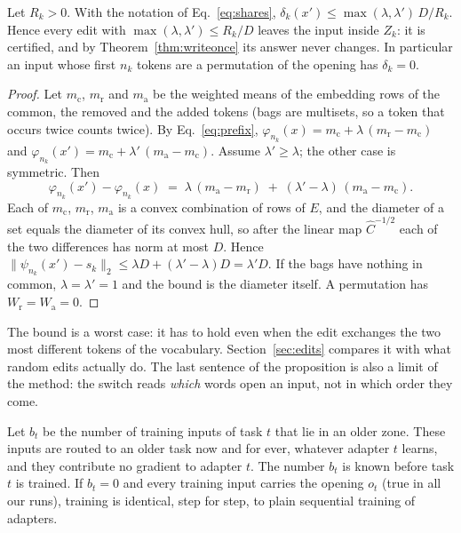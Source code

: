 \begin{proposition}
\label{prop:edits}
Let $R_k > 0$. With the notation of Eq.~\eqref{eq:shares}, $\delta_k(x') \le \max(\lambda, \lambda')\, D / R_k$.
Hence every edit with $\max(\lambda, \lambda') \le R_k / D$ leaves the input inside $Z_k$: it is
certified, and by Theorem~\ref{thm:writeonce} its answer never changes. In particular an input
whose first $n_k$ tokens are a permutation of the opening has $\delta_k = 0$.
\end{proposition}

\begin{proof}
Let $m_{\mathrm{c}}$, $m_{\mathrm{r}}$ and $m_{\mathrm{a}}$ be the weighted means of the embedding rows of the common, the removed
and the added tokens (bags are multisets, so a token that occurs twice counts twice). By
Eq.~\eqref{eq:prefix}, $\varphi_{n_k}(x) = m_{\mathrm{c}} + \lambda\,(m_{\mathrm{r}} - m_{\mathrm{c}})$ and
$\varphi_{n_k}(x') = m_{\mathrm{c}} + \lambda'\,(m_{\mathrm{a}} - m_{\mathrm{c}})$. Assume $\lambda' \ge \lambda$; the other case is
symmetric. Then
\[
  \varphi_{n_k}(x') - \varphi_{n_k}(x) \;=\; \lambda\,(m_{\mathrm{a}} - m_{\mathrm{r}}) \;+\; (\lambda' - \lambda)\,(m_{\mathrm{a}} - m_{\mathrm{c}}) .
\]
Each of $m_{\mathrm{c}}$, $m_{\mathrm{r}}$, $m_{\mathrm{a}}$ is a convex combination of rows of $E$, and the diameter of a set
equals the diameter of its convex hull, so after the linear map $\hat{C}^{-1/2}$ each of the two
differences has norm at most $D$. Hence
$\lVert \psi_{n_k}(x') - s_k \rVert_2 \le \lambda D + (\lambda' - \lambda) D = \lambda' D$. If the bags
have nothing in common, $\lambda = \lambda' = 1$ and the bound is the diameter itself. A
permutation has $W_{\mathrm{r}} = W_{\mathrm{a}} = 0$.
\end{proof}

The bound is a worst case: it has to hold even when the edit exchanges the two most different
tokens of the vocabulary. Section~\ref{sec:edits} compares it with what random edits actually do.
The last sentence of the proposition is also a limit of the method: the switch reads \emph{which}
words open an input, not in which order they come.

\begin{proposition}
\label{prop:price}
Let $b_t$ be the number of training inputs of task $t$ that lie in an older zone. These inputs are
routed to an older task now and for ever, whatever adapter $t$ learns, and they contribute no
gradient to adapter $t$. The number $b_t$ is known before task $t$ is trained. If $b_t = 0$ and every training input carries the opening $o_t$ (true in all our runs), training is identical, step for step, to plain sequential
training of adapters.
\end{proposition}

